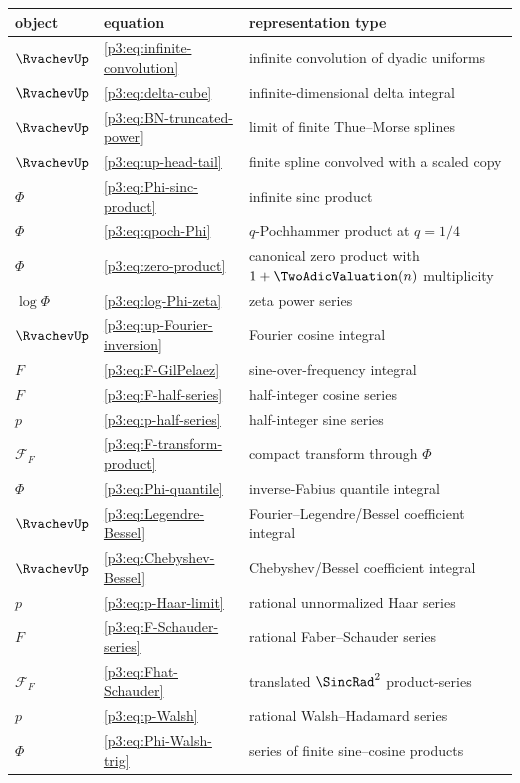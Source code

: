 \documentclass[11pt]{article}
\theoremstyle{definition}
\theoremstyle{remark}
\begin{document}
\begin{longtable}{@{}p{}p{}p{}@{}}
\toprule
object & equation & representation type\\
\midrule
\endhead
$\RvachevUp$ & \eqref{p3:eq:infinite-convolution} & infinite convolution of dyadic uniforms\\
$\RvachevUp$ & \eqref{p3:eq:delta-cube} & infinite-dimensional delta integral\\
$\RvachevUp$ & \eqref{p3:eq:BN-truncated-power} & limit of finite Thue--Morse splines\\
$\RvachevUp$ & \eqref{p3:eq:up-head-tail} & finite spline convolved with a scaled copy\\
$\Phi$ & \eqref{p3:eq:Phi-sinc-product} & infinite sinc product\\
$\Phi$ & \eqref{p3:eq:qpoch-Phi} & $q$-Pochhammer product at $q=1/4$\\
$\Phi$ & \eqref{p3:eq:zero-product} & canonical zero product with $1+\TwoAdicValuation(n)$ multiplicity\\
$\log\Phi$ & \eqref{p3:eq:log-Phi-zeta} & zeta power series\\
$\RvachevUp$ & \eqref{p3:eq:up-Fourier-inversion} & Fourier cosine integral\\
$F$ & \eqref{p3:eq:F-GilPelaez} & sine-over-frequency integral\\
$F$ & \eqref{p3:eq:F-half-series} & half-integer cosine series\\
$p$ & \eqref{p3:eq:p-half-series} & half-integer sine series\\
$\mathscr F_F$ & \eqref{p3:eq:F-transform-product} & compact transform through $\Phi$\\
$\Phi$ & \eqref{p3:eq:Phi-quantile} & inverse-Fabius quantile integral\\
$\RvachevUp$ & \eqref{p3:eq:Legendre-Bessel} & Fourier--Legendre/Bessel coefficient integral\\
$\RvachevUp$ & \eqref{p3:eq:Chebyshev-Bessel} & Chebyshev/Bessel coefficient integral\\
$p$ & \eqref{p3:eq:p-Haar-limit} & rational unnormalized Haar series\\
$F$ & \eqref{p3:eq:F-Schauder-series} & rational Faber--Schauder series\\
$\mathscr F_F$ & \eqref{p3:eq:Fhat-Schauder} & translated $\SincRad^2$ product-series\\
$p$ & \eqref{p3:eq:p-Walsh} & rational Walsh--Hadamard series\\
$\Phi$ & \eqref{p3:eq:Phi-Walsh-trig} & series of finite sine--cosine products\\

\end{longtable}
\end{document}

